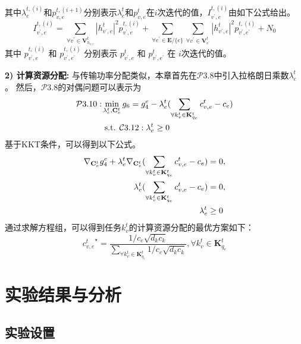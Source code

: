 其中$\lambda_{e}^{t,(i)}$和$p_{v, e}^{t, (i+1)}$分别表示$\lambda_{e}^{t}$和$p_{v, e}^{t}$在$i$次迭代的值，${I}_{v^{\prime}, e}^{t, (i)}$由如下公式给出。
\begin{equation}
	{I}_{v^{\prime}, e}^{t, (i)} = \sum\limits_{\forall v^{\prime} \in \mathbf{V}_{h_{v, e}}^{t}} |h_{v^{\prime}, e}^t|^2 p_{v^{\prime}, e}^{t, (i)} + \sum\limits_{\forall e^{\prime} \in \mathbf{E} / \{e\}} \sum\limits_{\forall v^{\prime} \in \mathbf{V}_{e^{\prime}}^{t}} |h_{v^{\prime}, e}^t|^2 p_{v^{\prime}, e^{\prime}}^{t, (i)} + N_{0}
\end{equation}
其中 $p_{v^{\prime}, e}^{t, (i)}$ 和 $p_{v^{\prime}, e^{\prime}}^{t, (i)}$ 分别表示 $p_{v^{\prime}, e}^{t}$ 和 $p_{v^{\prime}, e^{\prime}}^{t}$ 在 $i$次迭代的值。

\textbf{2) 计算资源分配:} 与传输功率分配类似，本章首先在$\mathcal{P}3.8$中引入拉格朗日乘数${\lambda}_{e}^{t}$。
然后，$\mathcal{P}3.8$的对偶问题可以表示为
\begin{align}
	\mathcal{P}3.10: & \min_{\mathbf{\lambda}_{e}^{t}, \mathbf{{C}}_{e}^{t}}  g_6 = g_4^e - {\lambda}_{e}^{t} (\sum_{\forall k_{v}^{t} \in {\mathbf{K}_{q_e}^{t} }} {c_{v, e}^t} - c_{e} ) \notag \\
		&\text { s.t. } \mathcal{C}3.12: \mathbf{\lambda}_{e}^{t} \geq 0 
\end{align}
基于KKT条件\cite{boyd2004convex}，可以得到以下公式。
\begin{align}
	\nabla_{\mathbf{C}_e^{t}} g_4^e + \mathbf{\lambda}_{e}^{t}\nabla_{\mathbf{C}_e^{t}} (\sum_{\forall k_{v}^{t} \in {\mathbf{K}_{q_e}^{t} }} {c_{v, e}^t} - c_{e} ) &= 0, \notag \\
	\mathbf{\lambda}_{e}^{t}( \sum_{\forall k_{v}^{t} \in {\mathbf{K}_{q_e}^{t} }} {c_{v, e}^t} - {c_{e}} ) &= 0, \notag \\
	\mathbf{\lambda}_{e}^{t} &\geq 0
\end{align}
通过求解方程组，可以得到任务$k_{v}^{t}$的计算资源分配的最优方案如下：
\begin{equation}
	{c_{v, e}^{t}}^{\star} = \frac{1 / c_e \sqrt{d_k  c_k} } {\sum_{\forall k_{v}^{t} \in {\mathbf{K}_{q_e}^{t} }} 1 / c_e \sqrt{d_k  c_k}} , \forall k_{v}^{t} \in {\mathbf{K}_{q_e}^{t} } 
\end{equation}

\section{实验结果与分析}\label{section 3-5}

\subsection{实验设置}

